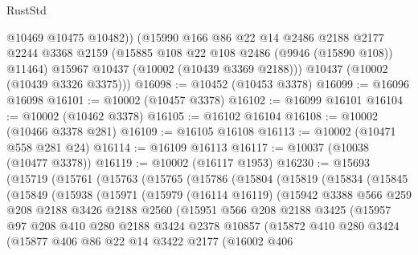 \begin{lexlean}{RustStd}
\begin{coremodule}
          @10469
          @10475
          @10482))
      (@15990
        @166
        @86
        @22
        @14
        @2486
        @2188
        @2177
        @2244
        @3368
        @2159
        (@15885 @108 @22 @108 @2486 (@9946 (@15890 @108)) @11464)
        @15967
        @10437
        (@10002 (@10439 @3369 @2188)))
      @10437
      (@10002 (@10439 @3326 @3375)))
@16098 := @10452 (@10453 @3378)
@16099 := @16096 @16098
@16101 := @10002 (@10457 @3378)
@16102 := @16099 @16101
@16104 := @10002 (@10462 @3378)
@16105 := @16102 @16104
@16108 := @10002 (@10466 @3378 @281)
@16109 := @16105 @16108
@16113 := @10002 (@10471 @558 @281 @24)
@16114 := @16109 @16113
@16117 := @10037 (@10038 (@10477 @3378))
@16119 := @10002 (@16117 @1953)
@16230 := @15693
    (@15719
      (@15761
        (@15763
          (@15765
            (@15786
              (@15804
                (@15819
                  (@15834
                    (@15845
                      (@15849
                        (@15938
                          (@15971
                            (@15979
                              (@16114 @16119)
                              (@15942
                                @3388
                                @566
                                @259
                                @208
                                @2188
                                @3426
                                @2188
                                @2560
                                (@15951
                                  @566
                                  @208
                                  @2188
                                  @3425
                                  (@15957
                                    @97
                                    @208
                                    @410
                                    @280
                                    @2188
                                    @3424
                                    @2378
                                    @10857
                                    (@15872
                                      @410
                                      @280
                                      @3424
                                      (@15877
                                        @406
                                        @86
                                        @22
                                        @14
                                        @3422
                                        @2177
                                        (@16002
                                          @406

\end{coremodule}
\end{lexlean}

